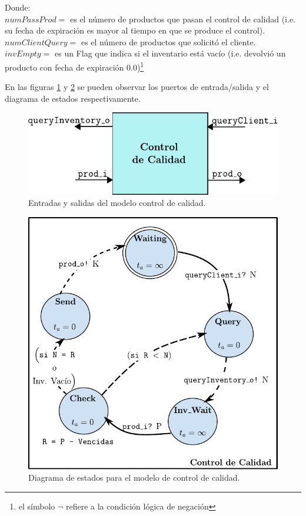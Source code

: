 \documentclass[10pt]{article}
\begin{document}
Donde:\\
$numPassProd = $ es el número de productos que pasan el control de calidad (i.e. su fecha de expiración es mayor al tiempo en que se produce el control).\\
$numClientQuery = $ es el número de productos que solicitó el cliente.\\
$invEmpty = $ es un Flag que indica si el inventario está vacío (i.e. devolvió un producto con fecha de expiración $0.0$)\footnote{el símbolo $\neg$ refiere a la condición lógica de negación}

En las figuras \ref{fig:CC-esquematico} y \ref{fig:CC-estados} se pueden observar los puertos de entrada/salida y el diagrama de estados respectivamente.

\begin{figure}[h]
	\centering
	\includegraphics{img/CC-esquematico}
	\caption{Entradas y salidas del modelo control de calidad.}
	\label{fig:CC-esquematico}
\end{figure}

\begin{figure}[h]
	\centering
	\includegraphics{img/controlCalidaddevsgraph}
	\caption{Diagrama de estados para el modelo de control de calidad.}
	\label{fig:CC-estados}
\end{figure}
\FloatBarrier
\end{document}
